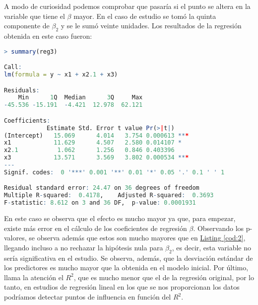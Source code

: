 \documentclass[12pt,a4paper]{article}
\begin{document}
A modo de curiosidad podemos comprobar que pasaría si el punto se altera en la variable que tiene el $\beta$ mayor. En el caso de estudio se tomó la quinta componente de $\beta_2$ y se le sumó veinte unidades. Los resultados de la regresión obtenida en este caso fueron:
\begin{lstlisting}[language=R, caption = Regresión lineal con un punto de influencia, label =cod:4]
> summary(reg3)

Call:
lm(formula = y ~ x1 + x2.1 + x3)

Residuals:
    Min      1Q  Median      3Q     Max 
-45.536 -15.191  -4.421  12.978  62.121 

Coefficients:
            Estimate Std. Error t value Pr(>|t|)    
(Intercept)   15.069      4.014   3.754 0.000613 ***
x1            11.629      4.507   2.580 0.014107 *  
x2.1           1.062      1.256   0.846 0.403396    
x3            13.571      3.569   3.802 0.000534 ***
---
Signif. codes:  0 '***' 0.001 '**' 0.01 '*' 0.05 '.' 0.1 ' ' 1

Residual standard error: 24.47 on 36 degrees of freedom
Multiple R-squared:  0.4178,	Adjusted R-squared:  0.3693 
F-statistic: 8.612 on 3 and 36 DF,  p-value: 0.0001931
\end{lstlisting}
En este caso se observa que el efecto es mucho mayor ya que, para empezar, existe más error en el cálculo de los coeficientes de regresión $\beta$. Observando los p-valores, se observa además que estos son mucho mayores que en \hyperref[cod:2]{Listing \ref{cod:2}}, llegando incluso a no rechazar la hipótesis nula para $\beta_2$, es decir, esta variable no sería significativa en el estudio. Se observa, además, que la desviación estándar de los predictores es mucho mayor que la obtenida en el modelo inicial. Por último, llama la atención el $R^2$, que es mucho menor que el de la regresión original, por lo tanto, en estudios de regresión lineal en los que se nos proporcionan los datos podríamos detectar puntos de influencia en función del $R^2$.
\end{document}

